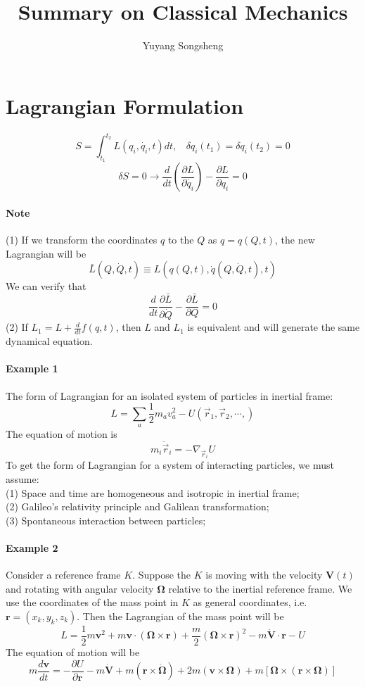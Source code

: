 \documentclass{article}
\author{Yuyang Songsheng}
\title{Summary on Classical Mechanics}
\begin{document}
\maketitle
\section{Lagrangian Formulation}
\[S=\int_{t_1}^{t_2}L(q_i,\dot{q_i},t)dt, \ \ \ \ \delta q_i(t_1) = \delta q_i(t_2) = 0\]
\[\delta S=0 \rightarrow \frac{d}{dt}(\frac{\partial L}{\partial \dot{q_i}}) - \frac{\partial L}{\partial q_i}=0\]
\paragraph{Note}
(1) If we transform the coordinates $q$ to the $Q$ as $q = q(Q,t)$, the new Lagrangian will be
\[\bar{L}(Q,\dot{Q},t) \equiv L(q(Q,t),\dot{q}(Q,\dot{Q},t),t)\]
We can verify that
\[\frac{d}{dt}\frac{\partial \bar{L}}{\partial \dot{Q}} - \frac{\partial \bar{L}}{\partial Q} = 0\]
(2) If $L_1 = L + \frac{d}{dt} f(q,t)$, then $L$ and $L_1$ is equivalent and will generate the same dynamical equation.\\
\paragraph{Example 1} The form of Lagrangian for an isolated system of particles in inertial frame:
\[L=\sum_a \frac{1}{2}m_a v_a^2 -U(\vec{r}_1,\vec{r}_2,\cdots,)\]
The equation of motion is
\[m_i \ddot{\vec{r}}_i = -\nabla_{\vec{r}_i} U\]
To get the form of Lagrangian for a system of interacting particles, we must assume:\\
(1) Space and time are homogeneous and isotropic in inertial frame;\\
(2) Galileo's relativity principle and Galilean transformation;\\
(3) Spontaneous interaction between particles;\\
\paragraph{Example 2} Consider a reference frame $K$. Suppose the $K$ is moving with the velocity $\mathbf{V}(t)$ and  rotating with angular velocity $\mathbf{\Omega}$  relative to the inertial reference frame. We use the coordinates of the mass point in $K$ as general coordinates, i.e. $\mathbf{r} = (x_k,y_k,z_k)$. Then the Lagrangian of the mass point will be
\[L = \frac{1}{2}m\mathbf{v}^2 + m\mathbf{v}\cdot(\mathbf{\Omega}\times\mathbf{r})+\frac{m}{2}(\mathbf{\Omega}\times\mathbf{r})^2 - m\dot{\mathbf{V}}\cdot\mathbf{r}-U\]
The equation of motion will be
\[m\frac{d\mathbf{v}}{dt} = -\frac{\partial U}{\partial \mathbf{r}} - m\dot{\mathbf{V}} + m(\mathbf{r} \times \dot{\mathbf{\Omega}}) + 2m(\mathbf{v} \times \mathbf{\Omega}) + m[\mathbf{\Omega}\times(\mathbf{r} \times \mathbf{\Omega})]\]
\end{document}
